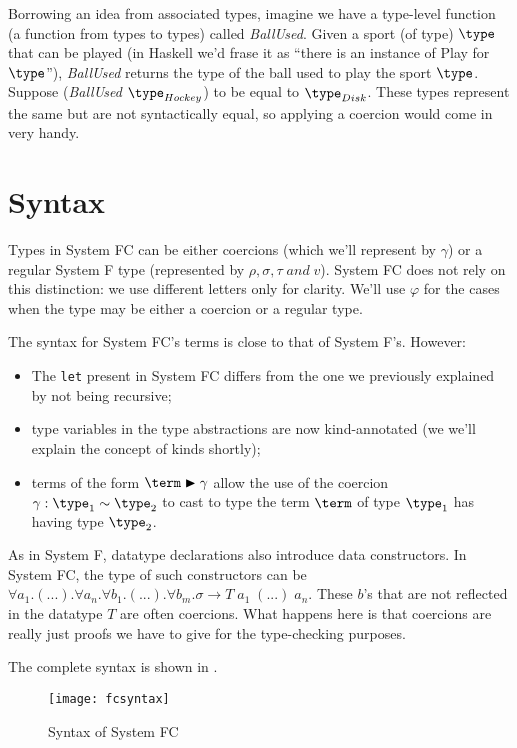 Borrowing an idea from associated types, imagine we have a type-level function (a function from types to types) called \textit{BallUsed}. Given a sport (of type) $\type$ that can be played (in Haskell we'd frase it as ``there is an instance of Play for $\type$''), \textit{BallUsed} returns the type of the ball used to play the sport $\type$. Suppose (\textit{BallUsed} $\type_{Hockey}$) to be equal to $\type_{Disk}$. These types represent the same but are not syntactically equal, so applying a coercion would come in very handy.

\section{Syntax}
Types in System FC can be either coercions (which we'll represent by $\gamma$) or a regular System F type (represented by $\rho,\sigma,\tau \; \mathit{and} \; v$). System FC does not rely on this distinction: we use different letters only for clarity. We'll use $\varphi$ for the cases when the type may be either a coercion or a regular type.

The syntax for System FC's terms is close to that of System F's. However:
\begin{itemize}
\item The \texttt{let} present in System FC differs from the one we previously explained by not being recursive;
\item type variables in the type abstractions are now kind-annotated (we we'll explain the concept of kinds shortly);
\item terms of the form $\term \blacktriangleright \gamma$ allow the use of the coercion $\gamma:\type_1 \sim \type_2$ to cast to type the term $\term$ of type $\type_1$ has having type $\type_2$.
\end{itemize}
As in System F, datatype declarations also introduce data constructors. In System FC, the type of such constructors can be $\forall a_1 . (...) .\forall a_n . \forall b_1. (...) .\forall b_m . \sigma \rightarrow T \; a_1 \; (...) \; a_n$. These $b$'s that are not reflected in the datatype $T$ are often coercions. What happens here is that coercions are really just proofs we have to give for the type-checking purposes.

The complete syntax is shown in .

\begin{figure}
  \centering
  \texttt{[image: fcsyntax]}
  \label{fcsyntax}
  \caption{Syntax of System FC}
\end{figure}

